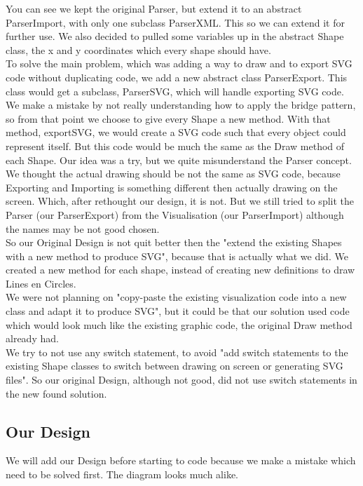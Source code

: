 \documentclass[a4paper,12pt]{article}
\begin{document}
You can see we kept the original Parser, but extend it to an abstract ParserImport, with only one subclass ParserXML. This so we can extend it for further use. We also decided to pulled some variables up in the abstract Shape class, the x and y coordinates which every shape should have.
\\
To solve the main problem, which was adding a way to draw and to export SVG code without duplicating code, we add a new abstract class ParserExport. This class would get a subclass, ParserSVG, which will handle exporting SVG code. We make a mistake by not really understanding how to apply the bridge pattern, so from that point we choose to give every Shape a new method. With that method, exportSVG, we would create a SVG code such that every object could represent itself. But this code would be much the same as the Draw method of each Shape. Our idea was a try, but we quite misunderstand the Parser concept. We thought the actual drawing should be not the same as SVG code, because Exporting and Importing is something different then actually drawing on the screen. Which, after rethought our design, it is not. But we still tried to split the Parser (our ParserExport) from the Visualisation (our ParserImport) although the names may be not good chosen. 
\\


So our Original Design is not quit better then the "extend the existing Shapes with a new method to produce SVG", because that is actually what we did. We created a new method for each shape, instead of creating new definitions to draw Lines en Circles.
\\
We were not planning on "copy-paste the existing visualization code into a new class and adapt it to produce SVG", but it could be that our solution used code which would look much like the existing graphic code, the original Draw method already had. 
\\
We try to not use any switch statement, to avoid "add switch statements to the existing Shape classes to switch between drawing on screen or generating SVG files". So our original Design, although not good, did not use switch statements in the new found solution.


\subsection{Our Design}
We will add our Design before starting to code because we make a mistake which need to be solved first. The diagram looks much alike.
\end{document}
